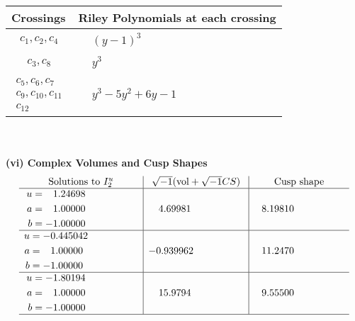 \documentclass[1p]{elsarticle_modified}
\theoremstyle{definition}
\newcommand{\I}{\sqrt{-1}}
\begin{document}
\begin{tabular}{m{50pt}|m{274pt}}
Crossings & \hspace{64pt}Riley Polynomials at each crossing \\
\hline $$\begin{aligned}c_{1},c_{2},c_{4}\end{aligned}$$&$\begin{aligned}
&(y-1)^3
\end{aligned}$\\
\hline $$\begin{aligned}c_{3},c_{8}\end{aligned}$$&$\begin{aligned}
&y^3
\end{aligned}$\\
\hline $$\begin{aligned}c_{5},c_{6},c_{7}\\c_{9},c_{10},c_{11}\\c_{12}\end{aligned}$$&$\begin{aligned}
&y^3-5 y^2+6 y-1
\end{aligned}$\\
\hline
\end{tabular}\\~\\
\newpage\flushleft \textbf{(vi) Complex Volumes and Cusp Shapes}
$$\begin{array}{c|c|c}  
\text{Solutions to }I^u_{2}& \I (\text{vol} + \sqrt{-1}CS) & \text{Cusp shape}\\
 \hline 
\begin{aligned}
u &= \phantom{-}1.24698\phantom{ +0.000000I} \\
a &= \phantom{-}1.00000\phantom{ +0.000000I} \\
b &= -1.00000\phantom{ +0.000000I}\end{aligned}
 & \phantom{-}4.69981\phantom{ +0.000000I} & \phantom{-}8.19810\phantom{ +0.000000I} \\ \hline\begin{aligned}
u &= -0.445042\phantom{ +0.000000I} \\
a &= \phantom{-}1.00000\phantom{ +0.000000I} \\
b &= -1.00000\phantom{ +0.000000I}\end{aligned}
 & -0.939962\phantom{ +0.000000I} & \phantom{-}11.2470\phantom{ +0.000000I} \\ \hline\begin{aligned}
u &= -1.80194\phantom{ +0.000000I} \\
a &= \phantom{-}1.00000\phantom{ +0.000000I} \\
b &= -1.00000\phantom{ +0.000000I}\end{aligned}
 & \phantom{-}15.9794\phantom{ +0.000000I} & \phantom{-}9.55500\phantom{ +0.000000I}\\
 \hline 
 \end{array}$$\newpage
\end{document}
